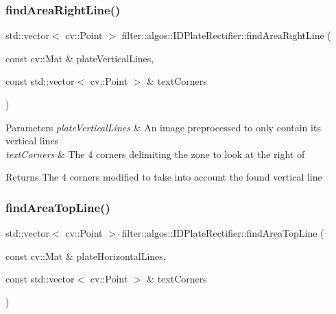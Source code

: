 \subsubsection{\texorpdfstring{find\+Area\+Right\+Line()}{findAreaRightLine()}}
{\footnotesize\ttfamily std\+::vector$<$ cv\+::\+Point $>$ filter\+::algos\+::\+I\+D\+Plate\+Rectifier\+::find\+Area\+Right\+Line (\begin{DoxyParamCaption}\item[{const cv\+::\+Mat \&}]{plate\+Vertical\+Lines,  }\item[{const std\+::vector$<$ cv\+::\+Point $>$ \&}]{text\+Corners }\end{DoxyParamCaption})\hspace{0.3cm}{\ttfamily [private]}}


\begin{DoxyParams}{Parameters}
{\em plate\+Vertical\+Lines} & An image preprocessed to only contain its vertical lines \\
\hline
{\em text\+Corners} & The 4 corners delimiting the zone to look at the right of \\
\hline
\end{DoxyParams}
\begin{DoxyReturn}{Returns}
The 4 corners modified to take into account the found vertical line 
\end{DoxyReturn}
\mbox{\label{classfilter_1_1algos_1_1_i_d_plate_rectifier_a84c1b751693bdf6aedc2a6c5cc0cec07}} 
\subsubsection{\texorpdfstring{find\+Area\+Top\+Line()}{findAreaTopLine()}}
{\footnotesize\ttfamily std\+::vector$<$ cv\+::\+Point $>$ filter\+::algos\+::\+I\+D\+Plate\+Rectifier\+::find\+Area\+Top\+Line (\begin{DoxyParamCaption}\item[{const cv\+::\+Mat \&}]{plate\+Horizontal\+Lines,  }\item[{const std\+::vector$<$ cv\+::\+Point $>$ \&}]{text\+Corners }\end{DoxyParamCaption})\hspace{0.3cm}{\ttfamily [private]}}


